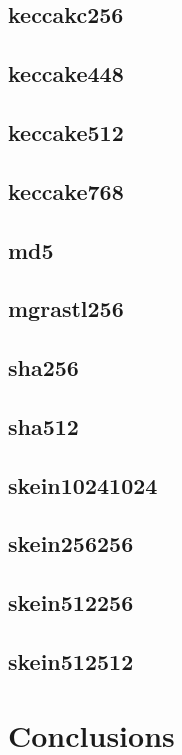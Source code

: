 \documentclass[10pt,a4paper]{article}
\begin{document}
\subsection{keccakc256}
\subsection{keccake448}
\subsection{keccake512}
\subsection{keccake768}
\subsection{md5}
\subsection{mgrastl256}
\subsection{sha256}
\subsection{sha512}
\subsection{skein10241024}
\subsection{skein256256}
\subsection{skein512256}
\subsection{skein512512}

\section*{Conclusions}
\end{document}
